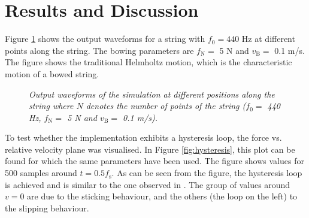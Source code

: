 \documentclass[twoside,a4paper,dvipsnames]{article}
\begin{document}
\section{Results and Discussion}\label{sec:results}

Figure \ref{fig:output44100} shows the output waveforms for a string with $f_0 = 440$ Hz at different points along the string. The bowing parameters are $f_\text{N} =$ 5 N and $v_\text{B} =$ 0.1 m/s. The figure shows the traditional Helmholtz motion, which is the characteristic motion of a bowed string.

\begin{figure}[ht]
  \centering
  \caption{\it Output waveforms of the simulation at different positions along the string where $N$ denotes the number of points of the string ($f_0 =$ 440 Hz, $f_\text{N} =$ 5 N and $v_\text{B} =$ 0.1 m/s). \label{fig:output44100}}
\end{figure}

To test whether the implementation exhibits a hysteresis loop, the force vs. relative velocity plane was visualised. In Figure \ref{fig:hysteresis}, this plot can be found for which the same parameters have been used. The figure shows values for 500 samples around $t = 0.5f_\text{s}$. As can be seen from the figure, the hysteresis loop is achieved and is similar to the one observed in \cite{Smith2000}. The group of values around $v=0$ are due to the sticking behaviour, and the others (the loop on the left) to the slipping behaviour.
\end{document}
